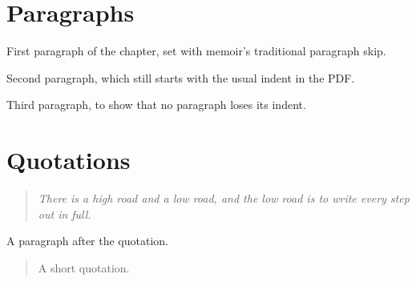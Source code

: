 \documentclass[11pt,oneside]{memoir}
\begin{document}
\chapter{Paragraphs}
First paragraph of the chapter, set with memoir's traditional paragraph skip.

Second paragraph, which still starts with the usual indent in the PDF.

Third paragraph, to show that no paragraph loses its indent.
\chapter{Quotations}
\begin{quotation}
  \itshape There is a high road and a low road, and the low road is to write every step out in full.
\end{quotation}
A paragraph after the quotation.

\begin{quotation}
  A short quotation.
\end{quotation}
\end{document}
